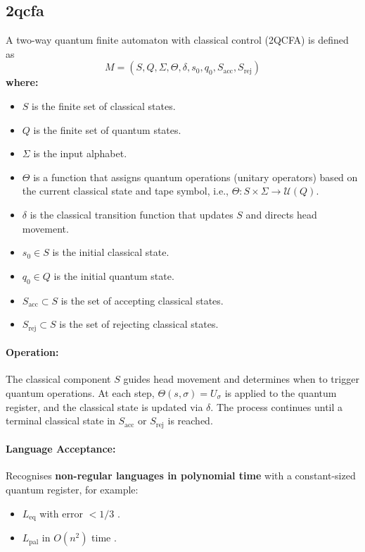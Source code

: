 \subsection{\acrfull{2qcfa}}
\label{subsec:2qcfa}
\begin{definition}
A two-way quantum finite automaton with classical control (2QCFA) is defined as 
\[
M = (S, Q, \Sigma, \Theta, \delta, s_0, q_0, S_{\text{acc}}, S_{\text{rej}})
\]
\textbf{where:}
\begin{itemize}
    \item \( S \) is the finite set of classical states.
    \item \( Q \) is the finite set of quantum states.
    \item \( \Sigma \) is the input alphabet.
    \item \( \Theta \) is a function that assigns quantum operations (unitary operators) based on the current classical state and tape symbol, i.e., \(\Theta: S \times \Sigma \to \mathcal{U}(Q)\).
    \item \( \delta \) is the classical transition function that updates \( S \) and directs head movement.
    \item \( s_0 \in S \) is the initial classical state.
    \item \( q_0 \in Q \) is the initial quantum state.
    \item \( S_{\text{acc}} \subset S \) is the set of accepting classical states.
    \item \( S_{\text{rej}} \subset S \) is the set of rejecting classical states.
\end{itemize}
\end{definition}

\paragraph{Operation:}  
The classical component \( S \) guides head movement and determines when to trigger quantum operations. At each step, \( \Theta(s, \sigma) = U_\sigma \) is applied to the quantum register, and the classical state is updated via \( \delta \). The process continues until a terminal classical state in \( S_{\text{acc}} \) or \( S_{\text{rej}} \) is reached.

\paragraph{Language Acceptance:}  
Recognises \textbf{non-regular languages in polynomial time} with a constant-sized quantum register, for example:
\begin{itemize}
    \item \( L_{\text{eq}} \) with error \( < 1/3 \) \cite{ambainis2002quantum}.
    \item \( L_{\text{pal}} \) in \( O(n^2) \) time \cite{yamakami2014constant}.
\end{itemize}

